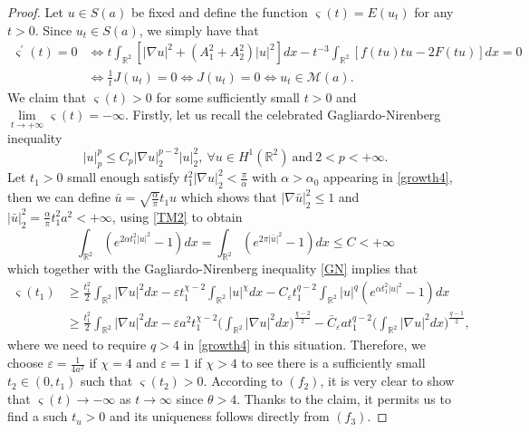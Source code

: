 \documentclass[11pt]{amsart}
\numberwithin{equation}{section}
\theoremstyle{definition}
\newcommand{\R}{\mathbb{R}}
\begin{document}
\begin{proof}
Let $u\in S(a)$ be fixed and define the function
 $\varsigma(t)=E(u_{t})$ for any $t>0$. Since $u_t\in S(a)$, we simply have that
\begin{align*}
\varsigma^\prime(t)=0  & \Longleftrightarrow t\int_{\R^2}[|\nabla u|^2 + (A_1^2+A_2^2)|u|^2]dx-t^{-3}\int_{\R^2}[f(tu)tu-2F(tu)]dx=0\\
& \Longleftrightarrow \frac1t J(u_t)=0  \Longleftrightarrow  J(u_t)=0  \Longleftrightarrow u_t\in \mathcal{M}(a).
\end{align*}
We claim that $\varsigma(t)>0$ for some sufficiently small $t>0$ and $\lim\limits_{t\to+\infty}\varsigma(t)=-\infty$.
Firstly, let us recall the celebrated Gagliardo-Nirenberg inequality
\begin{equation}\label{GN}
  |u|_p^p\leq C_{p}|\nabla u|_2^{p-2}|u|_2^2,~\forall u\in H^1(\R^2)~\text{and}~2<p<+\infty.
\end{equation}
Let $t_1>0$ small enough satisfy $t_1^2|\nabla u|_2^2<\frac{\pi}{\alpha}$ with $\alpha>\alpha_0$ appearing in \eqref{growth4},
then we can define $\bar{u}=\sqrt{\frac{\alpha}{\pi}}t_1u$ which shows that $|\nabla \bar{u}|_2^2\leq1$
and $|\bar{u}|_2^2=\frac{\alpha}{\pi}t_1^2a^2<+\infty$, using \eqref{TM2} to obtain
\begin{equation}\label{unique1}
\int_{\R^2} (e^{2\alpha t_1^2|u|^2}-1)dx
=\int_{\R^2} (e^{2\pi  |\bar{u}|^2}-1)dx\leq C<+\infty
\end{equation}
which together with the Gagliardo-Nirenberg inequality \eqref{GN} implies that
\begin{align*}
 \varsigma(t_1) & \geq \frac{t^2_1}2\int_{\R^2} |\nabla u|^2dx-\varepsilon  t_1^{\chi-2 }\int_{\R^2} |u|^\chi dx
-C_\varepsilon  t_1^{q-2}\int_{\R^2}|u|^{q }(e^{\alpha t_1^2|u|^2}-1)dx\\
   & \geq\frac{t_1^2}2\int_{\R^2} |\nabla u|^2dx
-\varepsilon a^2t_1^{\chi-2 }\bigg(
\int_{\R^2}|\nabla u|^{2}dx\bigg)^{\frac{\chi-2}{2}}-\bar{C}_\varepsilon
at_1^{q-2}\bigg(\int_{\R^2}|\nabla u|^{2}dx\bigg)^{\frac{q-1}{2}},
\end{align*}
where we need to require $q>4$ in \eqref{growth4} in this situation. Therefore, we choose $\varepsilon=\frac1{4a^2}$
if $\chi=4$ and $\varepsilon=1$ if $\chi>4$ to see there is a sufficiently small $t_2\in(0,t_1)$ such that $\varsigma(t_2)>0$.
According to $(f_2)$, it is very clear to show that $\varsigma(t)\to-\infty$ as $t\to\infty$ since $\theta>4$. Thanks to the claim,
it permits us to find a such $t_u>0$ and its uniqueness follows directly from $(f_3)$.


\end{proof}
\end{document}
